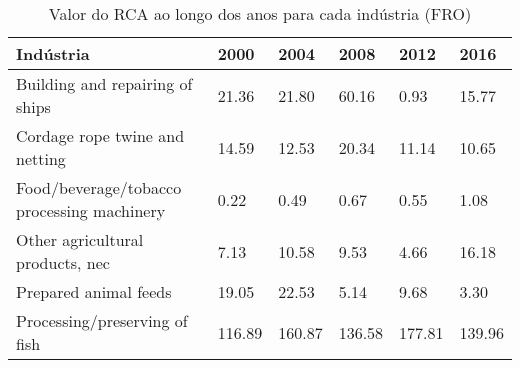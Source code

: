 \begin{table}
\centering
\caption{Valor do RCA ao longo dos anos para cada indústria (FRO)}
\begin{tabular}{p{6cm}p{1.5cm}p{1.5cm}p{1.5cm}p{1.5cm}p{1.5cm}}
\toprule
                                 Indústria &   2000 &   2004 &   2008 &   2012 &   2016 \\
\midrule
           Building and repairing of ships &  21.36 &  21.80 &  60.16 &   0.93 &  15.77 \\
            Cordage rope twine and netting &  14.59 &  12.53 &  20.34 &  11.14 &  10.65 \\
Food/beverage/tobacco processing machinery &   0.22 &   0.49 &   0.67 &   0.55 &   1.08 \\
          Other agricultural products, nec &   7.13 &  10.58 &   9.53 &   4.66 &  16.18 \\
                     Prepared animal feeds &  19.05 &  22.53 &   5.14 &   9.68 &   3.30 \\
             Processing/preserving of fish & 116.89 & 160.87 & 136.58 & 177.81 & 139.96 \\
\bottomrule
\end{tabular}
\end{table}
